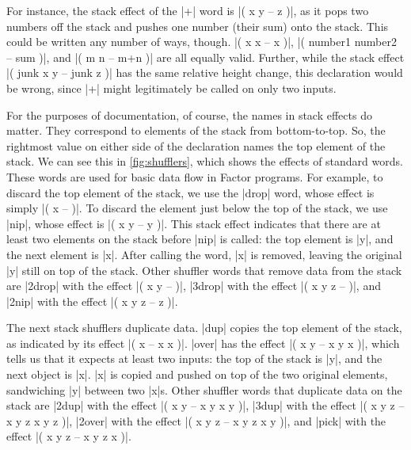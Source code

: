 For instance, the stack effect of the \factor|+| word is
%
\factor|( x y -- z )|,
%
as it pops two numbers off the stack and pushes one number (their sum) onto the
stack.  This could be written any number of ways, though.
%
\factor|( x x -- x )|,
%
\factor|( number1 number2 -- sum )|,
%
and
%
\factor|( m n -- m+n )|
%
are all equally valid.  Further, while the stack effect
%
\factor|( junk x y -- junk z )|
%
has the same relative height change, this declaration would be wrong, since
\factor|+| might legitimately be called on only two inputs.


For the purposes of documentation, of course, the names in stack effects do
matter.  They correspond to elements of the stack from bottom-to-top.  So, the
rightmost value on either side of the declaration names the top element of the
stack.  We can see this in \cref{fig:shufflers}, which shows the effects of
standard  words.  These words are used for basic data flow
in Factor programs.  For example, to discard the top element of the stack, we
use the \factor|drop| word, whose effect is simply
%
\factor|( x -- )|.
%
To discard the element just below the top of the stack, we use \factor|nip|,
whose effect is
%
\factor|( x y -- y )|.
%
This stack effect indicates that there are at least two elements on the stack
before \factor|nip| is called: the top element is \factor|y|, and the next
element is \factor|x|.  After calling the word, \factor|x| is removed, leaving
the original \factor|y| still on top of the stack.  Other shuffler words that
remove data from the stack are
%
\factor|2drop| with the effect \factor|( x y -- )|,
%
\factor|3drop| with the effect \factor|( x y z -- )|, and
%
\factor|2nip| with the effect \factor|( x y z -- z )|.

The next stack shufflers duplicate data.  \factor|dup| copies the top element
of the stack, as indicated by its effect \factor|( x -- x x )|.  \factor|over|
has the effect \factor|( x y -- x y x )|, which tells us that it expects at
least two inputs: the top of the stack is \factor|y|, and the next object is
\factor|x|.  \factor|x| is copied and pushed on top of the two original
elements, sandwiching \factor|y| between two \factor|x|s.  Other shuffler words
that duplicate data on the stack are
%
\factor|2dup| with the effect \factor|( x y -- x y x y )|,
%
\factor|3dup| with the effect \factor|( x y z -- x y z x y z )|,
%
\factor|2over| with the effect \factor|( x y z -- x y z x y )|, and
%
\factor|pick| with the effect \factor|( x y z -- x y z x )|.

